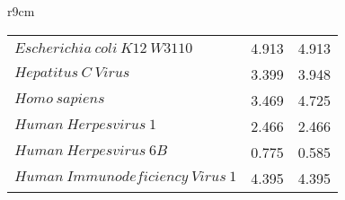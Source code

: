 \begin{wraptable}{r}{9cm}
\begin{tabular}{ @{ \makebox[2em][r]{\rownumber\space} } | lcc}
        $ Escherichia \ coli \ K12 \ W3110 $ & 4.913 & 4.913 \\ 
        $ Hepatitus \ C \ Virus $ & 3.399 & 3.948 \\ 
        $ Homo \ sapiens $ & 3.469 & 4.725 \\ 
        $ Human \ Herpesvirus \ 1 $ & 2.466 & 2.466 \\ 
        $ Human \ Herpesvirus \ 6B $ & 0.775 & 0.585 \\ 
        $ Human \ Immunodeficiency \ Virus \ 1 $ & 4.395 & 4.395 \\ 

\end{tabular}
\end{wraptable}
